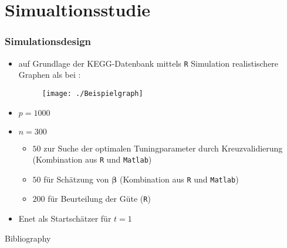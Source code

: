 \documentclass{beamer}
\begin{document}
\section{Simualtionsstudie}
\begin{frame}
	\frametitle{Simulationsdesign}
	\begin{itemize}
	\item auf Grundlage der KEGG-Datenbank mittels \texttt{R} Simulation realistischere Graphen als bei \cite{kim_network-based_2013}:
	\begin{figure}
	\centering
	\texttt{[image: ./Beispielgraph]}
	\label{fig:beispiel}
	\end{figure}
	\item $p=1000$
	\item $n=300$ 
	\begin{itemize}
	\item $50$ zur Suche der optimalen Tuningparameter durch Kreuzvalidierung (Kombination aus \texttt{R} und \texttt{Matlab})
	\item $50$ für Schätzung von $\boldsymbol{\beta}$ (Kombination aus \texttt{R} und \texttt{Matlab})
	\item $200$ für Beurteilung der Güte (\texttt{R})
	\end{itemize}
	\item Enet als Startschätzer für $t=1$
	\end{itemize}
\end{frame}



\begin{frame}{Bibliography}


\end{frame}


%


$  $
\end{document}
